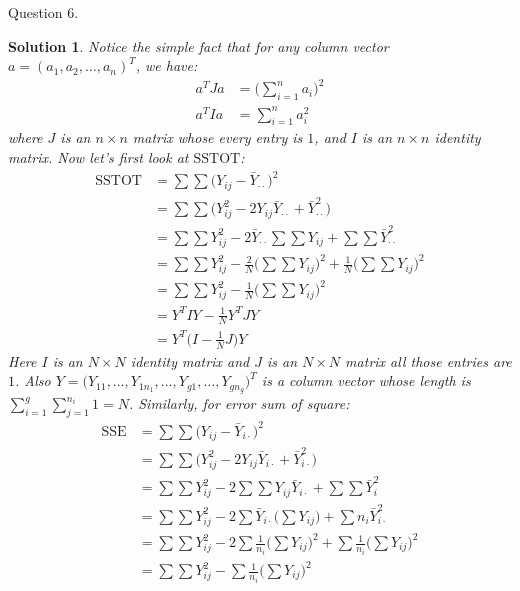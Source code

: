 \documentclass[11pt]{article}
\newtheorem{sol}{Solution}
\begin{document}
Question 6.
\begin{sol}
	Notice the simple fact that for any column vector $a = (a_1, a_2, \ldots, a_n)^{T}$, we have:
	\begin{align*}
		a^T J a &= \Big(\sum_{i = 1}^n a_i\Big)^2\\
		a^T I a &= \sum_{i = 1}^n a_i^2
	\end{align*}
	where $J$ is an $n \times n$ matrix whose every entry is $1$, and $I$ is an $n\times n$ identity matrix. \vskip 2mm
	Now let's first look at $\text{SSTOT}$:
	\begin{align*}
		\text{SSTOT} &= \sum\sum\Big(Y_{ij} - \bar{Y}_{\cdot\cdot}\Big)^2\\
		&= \sum\sum\Big(Y^2_{ij} - 2Y_{ij}\bar{Y}_{\cdot\cdot} + \bar{Y}^2_{\cdot\cdot}\Big)\\
		&= \sum\sum Y^2_{ij} - 2\bar{Y}_{\cdot\cdot}\sum\sum Y_{ij} + \sum\sum\bar{Y}^2_{\cdot\cdot}\\
		&= \sum\sum Y^2_{ij} - \frac{2}{N} \Big(\sum\sum Y_{ij}\Big)^2 + \frac{1}{N}\Big(\sum\sum Y_{ij}\Big)^2\\
		&= \sum\sum Y^2_{ij} - \frac{1}{N}\Big(\sum\sum Y_{ij}\Big)^2\\
		&= Y^T I Y -  \frac{1}{N}Y^T J Y\\
		&= Y^T\Big(I - \frac{1}{N}J\Big)Y
	\end{align*}
	Here $I$ is an $N \times N$ identity matrix and $J$ is an $N\times N$ matrix all those entries are $1$. Also $Y = \Big(Y_{11}, \ldots, Y_{1n_1}, \ldots, Y_{g1}, \ldots, Y_{gn_g}\Big)^T$ is a column vector whose length is $\sum_{i = 1}^g \sum_{j = 1}^{n_i}1 = N$.\vskip 2mm
	Similarly, for error sum of square:
	\begin{align*}
		\text{SSE} &= \sum\sum\Big(Y_{ij} - \bar{Y}_{i\cdot}\Big)^2\\
		                &=  \sum\sum\Big( Y^2_{ij} - 2Y_{ij}\bar{Y}_{i\cdot} + \bar{Y}^2_{i\cdot }\Big)\\
		                &= \sum\sum Y^2_{ij} - 2\sum\sum Y_{ij}\bar{Y}_{i\cdot} + \sum\sum\bar{Y}^2_{i}\\
		                &= \sum\sum Y^2_{ij} - 2\sum \bar{Y}_{i\cdot}\Big(\sum Y_{ij}\Big) + \sum n_i\bar{Y}^2_{i\cdot}\\
		                &= \sum\sum Y^2_{ij} - 2\sum \frac{1}{n_i} \Big(\sum Y_{ij}\Big)^2 + \sum \frac{1}{n_i}\Big(\sum Y_{ij}\Big)^2\\
		                &= \sum\sum Y^2_{ij} - \sum\frac{1}{n_i}\Big(\sum Y_{ij}\Big)^2\\

\end{align*}
\end{sol}
\end{document}
